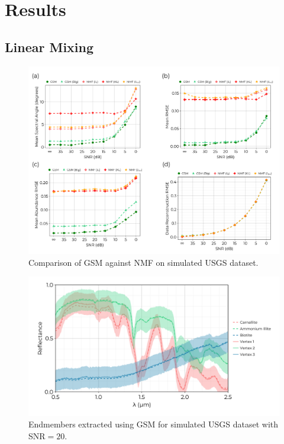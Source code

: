 \documentclass[remotesensing,article,submit,pdftex,moreauthors]{Definitions/mdpi}
\begin{document}
\section{Results}\label{sec:results}
\subsection{Linear Mixing}

\begin{figure}[H]
\includegraphics[width=\columnwidth]{results/usgs/fit-comparison.pdf}
\caption{Comparison of GSM against NMF on simulated USGS dataset. \label{fig:usgs-fits}}
\end{figure}  


\begin{figure}[H]
\includegraphics[width=\columnwidth]{results/usgs/extracted-endmembers.png}
\caption{Endmembers extracted using GSM for simulated USGS dataset with SNR$=20$. \label{fig:usgs-endmembers}}
\end{figure}  
\end{document}
